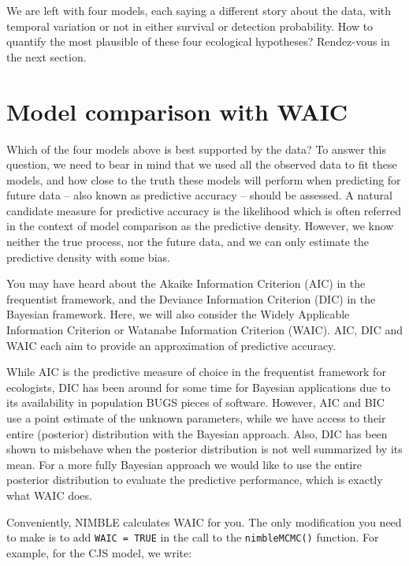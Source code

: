 \documentclass[
  12pt,
]{krantz}
\begin{document}
We are left with four models, each saying a different story about the data, with temporal variation or not in either survival or detection probability. How to quantify the most plausible of these four ecological hypotheses? Rendez-vous in the next section.

\section{Model comparison with WAIC}\label{waic}

Which of the four models above is best supported by the data? To answer this question, we need to bear in mind that we used all the observed data to fit these models, and how close to the truth these models will perform when predicting for future data -- also known as predictive accuracy -- should be assessed. A natural candidate measure for predictive accuracy is the likelihood which is often referred in the context of model comparison as the predictive density. However, we know neither the true process, nor the future data, and we can only estimate the predictive density with some bias.

You may have heard about the Akaike Information Criterion (AIC) in the frequentist framework, and the Deviance Information Criterion (DIC) in the Bayesian framework. Here, we will also consider the Widely Applicable Information Criterion or Watanabe Information Criterion (WAIC). AIC, DIC and WAIC each aim to provide an approximation of predictive accuracy.

While AIC is the predictive measure of choice in the frequentist framework for ecologists, DIC has been around for some time for Bayesian applications due to its availability in population BUGS pieces of software. However, AIC and BIC use a point estimate of the unknown parameters, while we have access to their entire (posterior) distribution with the Bayesian approach. Also, DIC has been shown to misbehave when the posterior distribution is not well summarized by its mean. For a more fully Bayesian approach we would like to use the entire posterior distribution to evaluate the predictive performance, which is exactly what WAIC does.

Conveniently, NIMBLE calculates WAIC for you. The only modification you need to make is to add \texttt{WAIC\ =\ TRUE} in the call to the \texttt{nimbleMCMC()} function. For example, for the CJS model, we write:
\end{document}
